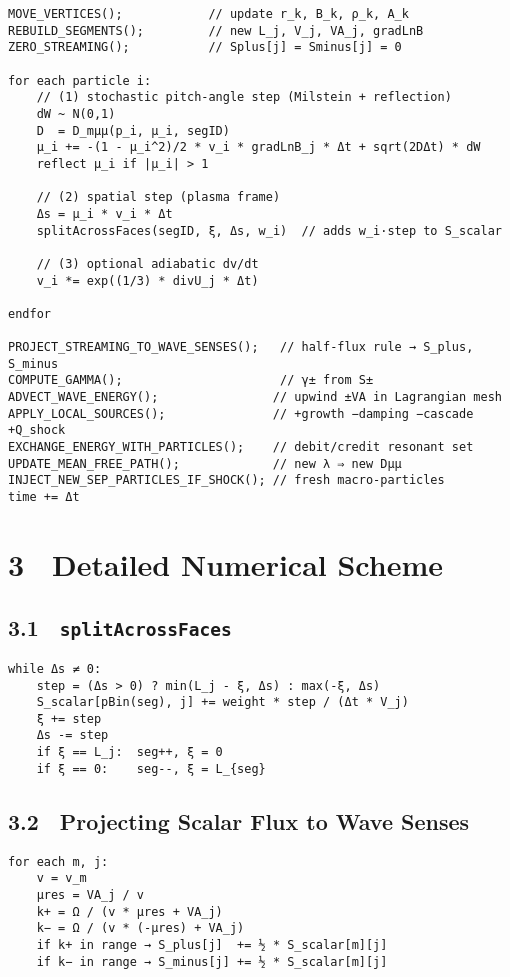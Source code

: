 {\begin{lstlisting}
MOVE_VERTICES();            // update r_k, B_k, ρ_k, A_k
REBUILD_SEGMENTS();         // new L_j, V_j, VA_j, gradLnB
ZERO_STREAMING();           // Splus[j] = Sminus[j] = 0

for each particle i:
    // (1) stochastic pitch-angle step (Milstein + reflection)
    dW ~ N(0,1)
    D  = D_mμμ(p_i, μ_i, segID)
    μ_i += -(1 - μ_i^2)/2 * v_i * gradLnB_j * Δt + sqrt(2DΔt) * dW
    reflect μ_i if |μ_i| > 1

    // (2) spatial step (plasma frame)
    Δs = μ_i * v_i * Δt
    splitAcrossFaces(segID, ξ, Δs, w_i)  // adds w_i·step to S_scalar

    // (3) optional adiabatic dv/dt
    v_i *= exp((1/3) * divU_j * Δt)

endfor

PROJECT_STREAMING_TO_WAVE_SENSES();   // half-flux rule → S_plus, S_minus
COMPUTE_GAMMA();                      // γ± from S±
ADVECT_WAVE_ENERGY();                // upwind ±VA in Lagrangian mesh
APPLY_LOCAL_SOURCES();               // +growth −damping −cascade +Q_shock
EXCHANGE_ENERGY_WITH_PARTICLES();    // debit/credit resonant set
UPDATE_MEAN_FREE_PATH();             // new λ ⇒ new Dμμ
INJECT_NEW_SEP_PARTICLES_IF_SHOCK(); // fresh macro-particles
time += Δt
\end{lstlisting}

\section*{3 Detailed Numerical Scheme}

\subsection*{3.1 \texttt{splitAcrossFaces}}

\begin{lstlisting}
while Δs ≠ 0:
    step = (Δs > 0) ? min(L_j - ξ, Δs) : max(-ξ, Δs)
    S_scalar[pBin(seg), j] += weight * step / (Δt * V_j)
    ξ += step
    Δs -= step
    if ξ == L_j:  seg++, ξ = 0
    if ξ == 0:    seg--, ξ = L_{seg}
\end{lstlisting}

\subsection*{3.2 Projecting Scalar Flux to Wave Senses}

\begin{lstlisting}
for each m, j:
    v = v_m
    μres = VA_j / v
    k+ = Ω / (v * μres + VA_j)
    k− = Ω / (v * (-μres) + VA_j)
    if k+ in range → S_plus[j]  += ½ * S_scalar[m][j]
    if k− in range → S_minus[j] += ½ * S_scalar[m][j]
\end{lstlisting}

}
